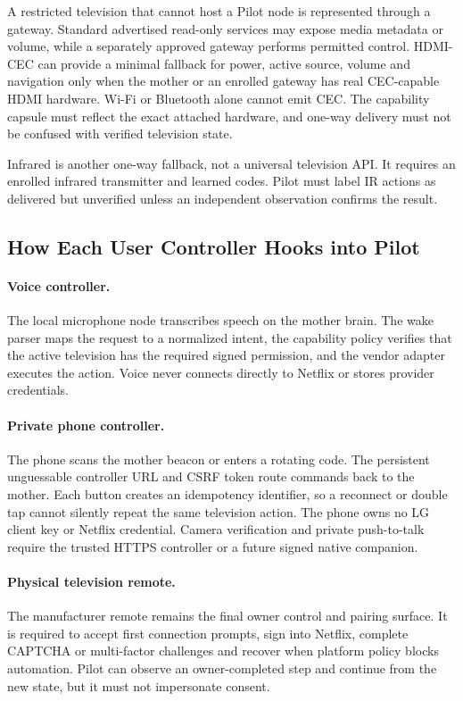 A restricted television that cannot host a Pilot node is represented through a
gateway. Standard advertised read-only services may expose media metadata or
volume, while a separately approved gateway performs permitted control.
HDMI-CEC can provide a minimal fallback for power, active source, volume and
navigation only when the mother or an enrolled gateway has real CEC-capable HDMI
hardware. Wi-Fi or Bluetooth alone cannot emit CEC. The capability capsule must
reflect the exact attached hardware, and one-way delivery must not be confused
with verified television state.

Infrared is another one-way fallback, not a universal television API. It requires
an enrolled infrared transmitter and learned codes. Pilot must label IR actions
as delivered but unverified unless an independent observation confirms the
result.

\subsection{How Each User Controller Hooks into Pilot}

\paragraph{Voice controller.}
The local microphone node transcribes speech on the mother brain. The wake parser
maps the request to a normalized intent, the capability policy verifies that the
active television has the required signed permission, and the vendor adapter
executes the action. Voice never connects directly to Netflix or stores provider
credentials.

\paragraph{Private phone controller.}
The phone scans the mother beacon or enters a rotating code. The persistent
unguessable controller URL and CSRF token route commands back to the mother. Each
button creates an idempotency identifier, so a reconnect or double tap cannot
silently repeat the same television action. The phone owns no LG client key or
Netflix credential. Camera verification and private push-to-talk require the
trusted HTTPS controller or a future signed native companion.

\paragraph{Physical television remote.}
The manufacturer remote remains the final owner control and pairing surface. It
is required to accept first connection prompts, sign into Netflix, complete
CAPTCHA or multi-factor challenges and recover when platform policy blocks
automation. Pilot can observe an owner-completed step and continue from the new
state, but it must not impersonate consent.

